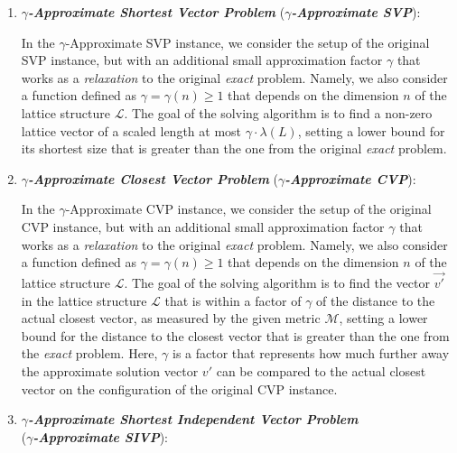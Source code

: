 \documentclass[runningheads]{llncs}
\numberwithin{equation}{section}
\begin{document}
    \begin{enumerate}
        \item \textbf{\textit{$\gamma$-Approximate Shortest Vector Problem}} (\textbf{\textit{$\gamma$-Approximate SVP}}):
        \vspace{0.6ex}
        
        In the $\gamma$-Approximate SVP instance, we consider the setup of the original SVP instance, but with an additional small approximation factor $\gamma$ that works as a \textit{relaxation} to the original \textit{exact} problem. Namely, we also consider a function defined as $\gamma = \gamma(n) \geq 1$ that depends on the dimension $n$ of the lattice structure $\mathcal{L}$. The goal of the solving algorithm is to find a non-zero lattice vector of a scaled length at most $\gamma \cdot \lambda(L)$, setting a lower bound for its shortest size that is greater than the one from the original \textit{exact} problem.
        \vspace{2ex}
        
        \item \textbf{\textit{$\gamma$-Approximate Closest Vector Problem}} (\textbf{\textit{$\gamma$-Approximate CVP}}):
        \vspace{0.6ex}

        In the $\gamma$-Approximate CVP instance, we consider the setup of the original CVP instance, but with an additional small approximation factor $\gamma$ that works as a \textit{relaxation} to the original \textit{exact} problem. Namely, we also consider a function defined as $\gamma = \gamma(n) \geq 1$ that depends on the dimension $n$ of the lattice structure $\mathcal{L}$. The goal of the solving algorithm is to find the vector $\Vec{v'}$ in the lattice structure $\mathcal{L}$ that is within a factor of $\gamma$ of the distance to the actual closest vector, as measured by the given metric $\mathcal{M}$, setting a lower bound for the distance to the closest vector that is greater than the one from the \textit{exact} problem. Here, $\gamma$ is a factor that represents how much further away the approximate solution vector $v'$ can be compared to the actual closest vector on the configuration of the original CVP instance.
        \vspace{2ex}
        
        \item \textbf{\textit{$\gamma$-Approximate Shortest Independent Vector Problem}}\\(\textbf{\textit{$\gamma$-Approximate SIVP}}):
        \vspace{0.6ex}
        

\end{enumerate}
\end{document}

